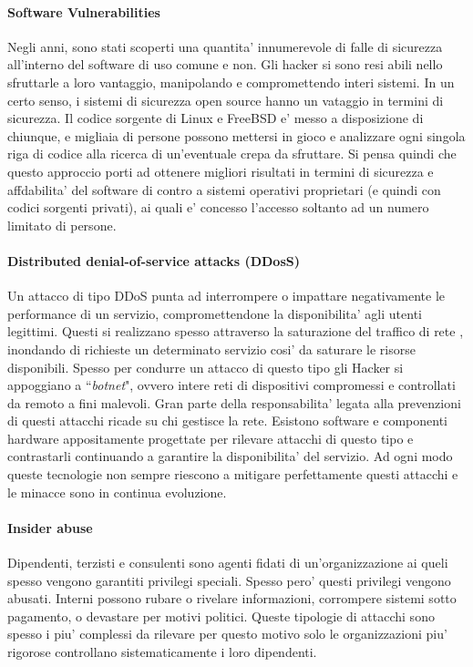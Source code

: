 \paragraph{Software Vulnerabilities}
Negli anni, sono stati scoperti una quantita' innumerevole di falle di sicurezza all'interno del software di uso comune e non. Gli hacker si sono resi abili nello sfruttarle a loro vantaggio, manipolando e compromettendo interi sistemi. In un certo senso, i sistemi di sicurezza open source hanno un vataggio in termini di sicurezza. Il codice sorgente di Linux e FreeBSD e' messo a disposizione di chiunque, e migliaia di persone possono mettersi in gioco e analizzare ogni singola riga di codice alla ricerca di un'eventuale crepa da sfruttare. Si pensa quindi che questo approccio porti ad ottenere migliori risultati in termini di sicurezza e affdabilita' del software di contro a sistemi operativi proprietari (e quindi con codici sorgenti privati), ai quali e' concesso l'accesso soltanto ad un numero limitato di persone.

\paragraph{Distributed denial-of-service attacks (DDosS)}
Un attacco di tipo DDoS punta ad interrompere o impattare negativamente le performance di un servizio, compromettendone la disponibilita' agli utenti legittimi. Questi si realizzano spesso attraverso la saturazione del traffico di rete , inondando di richieste un determinato servizio cosi' da saturare le risorse disponibili. Spesso per condurre un attacco di questo tipo gli Hacker si appoggiano a ``\emph{botnet}", ovvero intere reti di dispositivi compromessi e controllati da remoto a fini malevoli. Gran parte della responsabilita' legata alla prevenzioni di questi attacchi ricade su chi gestisce la rete. Esistono software e componenti hardware appositamente progettate per rilevare attacchi di questo tipo e contrastarli continuando a garantire la disponibilita' del servizio. Ad ogni modo queste tecnologie non sempre riescono a mitigare perfettamente questi attacchi e le minacce sono in continua evoluzione.

\paragraph{Insider abuse}
Dipendenti, terzisti e consulenti sono agenti fidati di un'organizzazione ai queli spesso vengono garantiti privilegi speciali. Spesso pero' questi privilegi vengono abusati. Interni possono rubare o rivelare informazioni, corrompere sistemi sotto pagamento, o devastare per motivi politici. Queste tipologie di attacchi sono spesso i piu' complessi da rilevare per questo motivo solo le organizzazioni piu' rigorose controllano sistematicamente i loro dipendenti.


